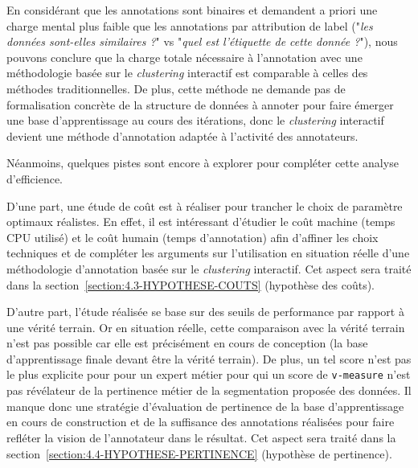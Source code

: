 			En considérant que les annotations sont binaires et demandent a priori une charge mental plus faible que les annotations par attribution de label ("\textit{les données sont-elles similaires ?}" vs "\textit{quel est l'étiquette de cette donnée ?}"), nous pouvons conclure que la charge totale nécessaire à l'annotation avec une méthodologie basée sur le \textit{clustering} interactif est comparable à celles des méthodes traditionnelles.
			De plus, cette méthode ne demande pas de formalisation concrète de la structure de données à annoter pour faire émerger une base d'apprentissage au cours des itérations, donc le \textit{clustering} interactif devient une méthode d'annotation adaptée à l'activité des annotateurs.
			
			Néanmoins, quelques pistes sont encore à explorer pour compléter cette analyse d'efficience.
			
			D'une part, une étude de coût est à réaliser pour trancher le choix de paramètre optimaux réalistes. En effet, il est intéressant d'étudier le coût machine (temps CPU utilisé) et le coût humain (temps d'annotation) afin d'affiner les choix techniques et de compléter les arguments sur l'utilisation en situation réelle d'une méthodologie d'annotation basée sur le \textit{clustering} interactif.
			Cet aspect sera traité dans la section~\ref{section:4.3-HYPOTHESE-COUTS} (hypothèse des coûts).
			
			D'autre part, l'étude réalisée se base sur des seuils de performance par rapport à une vérité terrain.
			Or en situation réelle, cette comparaison avec la vérité terrain n'est pas possible car elle est précisément en cours de conception (la base d'apprentissage finale devant être la vérité terrain).
			De plus, un tel score n'est pas le plus explicite pour pour un expert métier pour qui un score de \texttt{v-measure} n'est pas révélateur de la pertinence métier de la segmentation proposée des données.
			Il manque donc une stratégie d'évaluation de pertinence de la base d'apprentissage en cours de construction et de la suffisance des annotations réalisées pour faire refléter la vision de l'annotateur dans le résultat.
			Cet aspect sera traité dans la section~\ref{section:4.4-HYPOTHESE-PERTINENCE} (hypothèse de pertinence).
			
